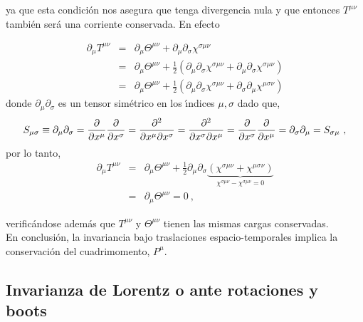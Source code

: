 ya que esta condición nos asegura que tenga divergencia nula y que entonces $T^{\mu \nu }$ también será una corriente conservada. En efecto


\begin{eqnarray*}
\partial _{\mu }T^{\mu \nu } &=&\partial _{\mu }\Theta ^{\mu \nu }+\partial
_{\mu }\partial _{\sigma }\chi ^{\sigma \mu \nu } \\
&=&\partial _{\mu }\Theta ^{\mu \nu }+\frac{1}{2}\left( \partial _{\mu
}\partial _{\sigma }\chi ^{\sigma \mu \nu }+\partial _{\mu }\partial
_{\sigma }\chi ^{\sigma \mu \nu }\right)  \\
&=&\partial _{\mu }\Theta ^{\mu \nu }+\frac{1}{2}\left( \partial _{\mu
}\partial _{\sigma }\chi ^{\sigma \mu \nu }+\partial _{\sigma }\partial
_{\mu }\chi ^{\mu \sigma \nu }\right) 
\end{eqnarray*}%
donde $\partial _{\mu }\partial _{\sigma }$ es un tensor sim\'{e}trico en
los \'{\i}ndices $\mu ,\sigma $ dado que,%
\begin{equation*}
S_{\mu \sigma }\equiv \partial _{\mu }\partial _{\sigma }=\frac{\partial }{%
\partial x^{\mu }}\frac{\partial }{\partial x^{\sigma }}=\frac{\partial ^{2}%
}{\partial x^{\mu }\partial x^{\sigma }}=\frac{\partial ^{2}}{\partial
x^{\sigma }\partial x^{\mu }}=\frac{\partial }{\partial x^{\sigma }}\frac{%
\partial }{\partial x^{\mu }}=\partial _{\sigma }\partial _{\mu }=S_{\sigma
\mu }~,
\end{equation*}%
por lo tanto,
\begin{eqnarray*}
\partial _{\mu }T^{\mu \nu } &=&\partial _{\mu }\Theta ^{\mu \nu }+\frac{1}{2%
}\partial _{\mu }\partial _{\sigma }\underset{\chi ^{\sigma \mu \nu }-\chi
^{\sigma \mu \nu }=0}{\underbrace{\left( \chi ^{\sigma \mu \nu }+\chi ^{\mu
\sigma \nu }\right) }} \\
&=&\partial _{\mu }\Theta ^{\mu \nu } =0~,
\end{eqnarray*}

\noindent
verificándose además que $T^{\mu \nu}$ y $\Theta^{\mu \nu}$ tienen las mismas cargas conservadas.\\

En conclusión, la invariancia bajo traslaciones espacio-temporales implica la conservación del cuadrimomento, $P^{\mu}$.


\vspace{1cm}

\subsection{Invarianza de Lorentz o ante rotaciones y boots}

